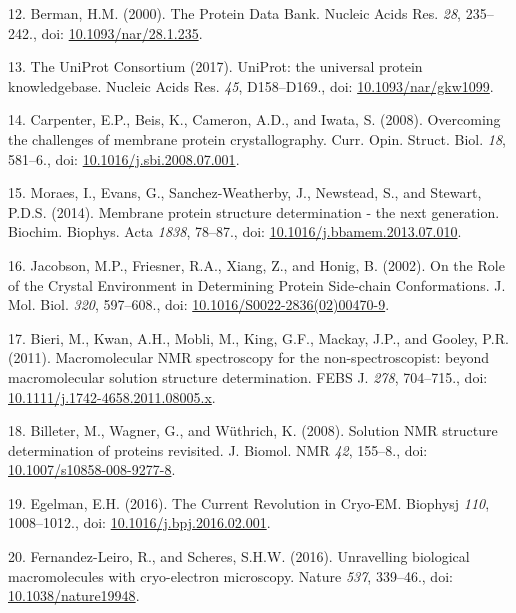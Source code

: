 \documentclass[11pt,a4paper,twoside]{book}
\theoremstyle{definition}
\theoremstyle{definition}
\theoremstyle{remark}
\begin{document}
\hypertarget{ref-Berman2000}{}
12. Berman, H.M. (2000). The Protein Data Bank. Nucleic Acids Res.
\emph{28}, 235--242., doi:
\href{https://doi.org/10.1093/nar/28.1.235}{10.1093/nar/28.1.235}.

\hypertarget{ref-TheUniProtConsortium2017}{}
13. The UniProt Consortium (2017). UniProt: the universal protein
knowledgebase. Nucleic Acids Res. \emph{45}, D158--D169., doi:
\href{https://doi.org/10.1093/nar/gkw1099}{10.1093/nar/gkw1099}.

\hypertarget{ref-Carpenter2008}{}
14. Carpenter, E.P., Beis, K., Cameron, A.D., and Iwata, S. (2008).
Overcoming the challenges of membrane protein crystallography. Curr.
Opin. Struct. Biol. \emph{18}, 581--6., doi:
\href{https://doi.org/10.1016/j.sbi.2008.07.001}{10.1016/j.sbi.2008.07.001}.

\hypertarget{ref-Moraes2014}{}
15. Moraes, I., Evans, G., Sanchez-Weatherby, J., Newstead, S., and
Stewart, P.D.S. (2014). Membrane protein structure determination - the
next generation. Biochim. Biophys. Acta \emph{1838}, 78--87., doi:
\href{https://doi.org/10.1016/j.bbamem.2013.07.010}{10.1016/j.bbamem.2013.07.010}.

\hypertarget{ref-Jacobson2002}{}
16. Jacobson, M.P., Friesner, R.A., Xiang, Z., and Honig, B. (2002). On
the Role of the Crystal Environment in Determining Protein Side-chain
Conformations. J. Mol. Biol. \emph{320}, 597--608., doi:
\href{https://doi.org/10.1016/S0022-2836(02)00470-9}{10.1016/S0022-2836(02)00470-9}.

\hypertarget{ref-Bieri2011}{}
17. Bieri, M., Kwan, A.H., Mobli, M., King, G.F., Mackay, J.P., and
Gooley, P.R. (2011). Macromolecular NMR spectroscopy for the
non-spectroscopist: beyond macromolecular solution structure
determination. FEBS J. \emph{278}, 704--715., doi:
\href{https://doi.org/10.1111/j.1742-4658.2011.08005.x}{10.1111/j.1742-4658.2011.08005.x}.

\hypertarget{ref-Billeter2008}{}
18. Billeter, M., Wagner, G., and Wüthrich, K. (2008). Solution NMR
structure determination of proteins revisited. J. Biomol. NMR \emph{42},
155--8., doi:
\href{https://doi.org/10.1007/s10858-008-9277-8}{10.1007/s10858-008-9277-8}.

\hypertarget{ref-Egelman2016}{}
19. Egelman, E.H. (2016). The Current Revolution in Cryo-EM. Biophysj
\emph{110}, 1008--1012., doi:
\href{https://doi.org/10.1016/j.bpj.2016.02.001}{10.1016/j.bpj.2016.02.001}.

\hypertarget{ref-Fernandez-Leiro2016}{}
20. Fernandez-Leiro, R., and Scheres, S.H.W. (2016). Unravelling
biological macromolecules with cryo-electron microscopy. Nature
\emph{537}, 339--46., doi:
\href{https://doi.org/10.1038/nature19948}{10.1038/nature19948}.
\end{document}
